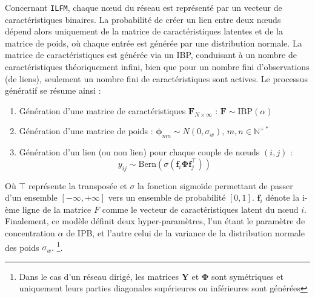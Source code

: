 \documentclass[french]{hermes-journal}
\newcommand{\ilfm}{\texttt{ILFM}}
\newcommand{\IBP}{\mathrm{IBP}}
\newcommand{\mat}[1]{\bm{#1}}
\begin{document}
Concernant \ilfm, chaque n\oe{}ud du réseau est représenté par un vecteur de caractéristiques binaires. La probabilité de créer un lien entre deux n\oe{}uds dépend alors uniquement de la matrice de caractéristiques latentes et de la matrice  de poids, où chaque entrée est générée par une distribution normale. La matrice de caractéristiques est générée via un IBP, conduisant à un nombre de caractéristiques théoriquement infini, bien que pour un nombre fini d'observations (de liens), seulement un nombre fini de caractéristiques sont actives. Le processus génératif se résume ainsi :
\begin{enumerate}
\item Génération d'une matrice de caractéristiques $\mat{F}_{N \times \infty}$ : $\mat{F} \sim \IBP(\alpha)$
\item Génération d'une matrice de poids : $\mat{\phi}_{mn} \sim N(0, \sigma_w), \, m,n \in \mathbb{N}^{+*}$
\item Génération d'un lien (ou non lien) pour chaque couple de n\oe{}uds $(i,j)$ : 
\begin{equation*}
y_{ij} \sim \mathrm{Bern}(\sigma(\mat{f}_{i} \mat{\Phi} \mat{f}_{j}^\top))
\label{eq:link-ilfm}
\end{equation*}
\end{enumerate}
%

Où $\top$ représente la transposée et $\sigma$ la fonction sigmoïde permettant de passer d'un ensemble $[-\infty, +\infty]$ vers un ensemble de probabilité $[0,1]$.  $\mat{f}_{i}$ dénote la i-ème ligne de la matrice $F$ comme le vecteur de caractéristiques latent du n\oe{}ud $i$. Finalement, ce modèle définit deux hyper-paramètres, l'un étant le paramètre de concentration $\alpha$ de IPB, et l'autre celui de la variance de la distribution normale des poids $\sigma_w$. \footnote{Dans le cas d'un réseau dirigé, les matrices $\mat{Y}$ et $\mat{\Phi}$ sont symétriques et uniquement leurs parties diagonales supérieures ou inférieures sont générées}. ~\\
\end{document}
